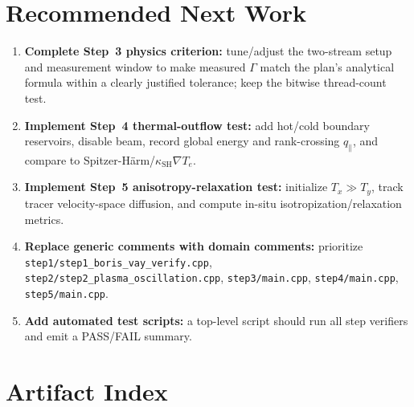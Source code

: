 \documentclass[11pt,a4paper]{article}
\begin{document}
\section{Recommended Next Work}

\begin{enumerate}[leftmargin=*]
  \item \textbf{Complete Step~3 physics criterion:} tune/adjust the two-stream setup and measurement window to make measured $\Gamma$ match the plan's analytical formula within a clearly justified tolerance; keep the bitwise thread-count test.
  \item \textbf{Implement Step~4 thermal-outflow test:} add hot/cold boundary reservoirs, disable beam, record global energy and rank-crossing $q_\parallel$, and compare to Spitzer-H\"arm/$\kappa_{\mathrm{SH}}\nabla T_e$.
  \item \textbf{Implement Step~5 anisotropy-relaxation test:} initialize $T_x\gg T_y$, track tracer velocity-space diffusion, and compute in-situ isotropization/relaxation metrics.
  \item \textbf{Replace generic comments with domain comments:} prioritize \texttt{step1/step1\_boris\_vay\_verify.cpp}, \texttt{step2/step2\_plasma\_oscillation.cpp}, \texttt{step3/main.cpp}, \texttt{step4/main.cpp}, \texttt{step5/main.cpp}.
  \item \textbf{Add automated test scripts:} a top-level script should run all step verifiers and emit a PASS/FAIL summary.
\end{enumerate}

\section{Artifact Index}
\end{document}

